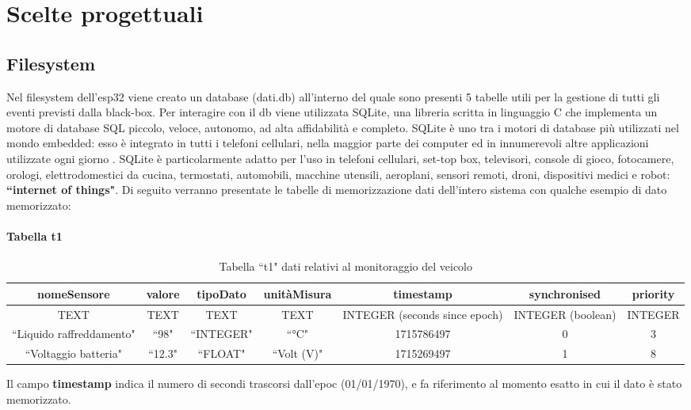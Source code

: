 \documentclass[12pt, a4paper, italian]{report}
\numberwithin{figure}{chapter}
\numberwithin{table}{chapter}
\begin{document}
\section{Scelte progettuali}
\subsection{Filesystem}
Nel filesystem dell'esp32 viene creato un database (dati.db) all'interno del quale sono presenti 5 tabelle utili per la gestione di tutti gli eventi previsti dalla black-box. Per interagire con il db viene utilizzata SQLite, una libreria scritta in linguaggio C che implementa un motore di database SQL piccolo, veloce, autonomo, ad alta affidabilità e completo. SQLite è uno tra i motori di database più utilizzati nel mondo embedded: esso è integrato in tutti i telefoni cellulari, nella maggior parte dei computer ed in innumerevoli altre applicazioni utilizzate ogni giorno \cite{sqliteWhentoUse}. SQLite è particolarmente adatto per l'uso in telefoni cellulari, set-top box, televisori, console di gioco, fotocamere, orologi, elettrodomestici da cucina, termostati, automobili, macchine utensili, aeroplani, sensori remoti, droni, dispositivi medici e robot: \textbf{``internet of things"}.
Di seguito verranno presentate le tabelle di memorizzazione dati dell'intero sistema con qualche esempio di dato memorizzato:

\paragraph{Tabella t1}
\begin{table}[h!]
  \centering 
  \begin{adjustbox}{max width=\textwidth}
    \begin{tabular}{|c|c|c|c|c|c|c|}
      \hline
      \textbf{nomeSensore} & \textbf{valore} & \textbf{tipoDato} & \textbf{unitàMisura} & \textbf{timestamp} & \textbf{synchronised} & \textbf{priority} \\
      \hline
      TEXT & TEXT & TEXT & TEXT & INTEGER (seconds since epoch) & INTEGER (boolean) & INTEGER \\
      \hline
      ``Liquido raffreddamento" & ``98" & ``INTEGER" & ``°C" & 1715786497 & 0 & 3 \\
      \hline
      ``Voltaggio batteria" & ``12.3" & ``FLOAT" & ``Volt (V)" & 1715269497 & 1 & 8 \\
      \hline
    \end{tabular}
  \end{adjustbox}
  \caption{Tabella ``t1" dati relativi al monitoraggio del veicolo}
  \label{tab:t1 monitoraggio}
\end{table}
Il campo \textbf{timestamp} indica il numero di secondi trascorsi dall'epoc (01/01/1970), e fa riferimento al momento esatto in cui il dato è stato memorizzato.
\end{document}
